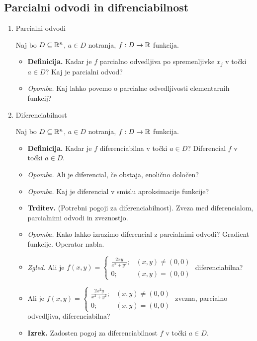 \subsection{Parcialni odvodi in difrenciabilnost}
\begin{enumerate}
    \item Parcialni odvodi
    
    Naj bo $D \subseteq \mathbb{R}^n$, $a \in D$ notranja, $f: D \to \mathbb{R}$ funkcija.
    
    \begin{itemize}
        \item \colorbox{purple!30}{\textbf{Definicija.}} Kadar je $f$ parcialno odvedljiva po spremenljivke $x_j$ v točki $a \in D$? Kaj je parcialni odvod?
        \item \colorbox{yellow!30}{\emph{Opomba.}} Kaj lahko povemo o parcialne odvedljivosti elementarnih funkcij?
    \end{itemize}

    \item Diferenciabilnost
    
    Naj bo $D \subseteq \mathbb{R}^n$, $a \in D$ notranja, $f: D \to \mathbb{R}$ funkcija.
    
    \begin{itemize}
        \item \colorbox{purple!30}{\textbf{Definicija.}} Kadar je $f$ diferenciabilna v točki $a \in D$? Diferencial $f$ v točki $a \in D$.
        \item \colorbox{yellow!30}{\emph{Opomba.}} Ali je diferencial, če obstaja, enolično določen?
        \item \colorbox{yellow!30}{\emph{Opomba.}} Kaj je diferencial v smislu aproksimacije funkcije?
        \item \colorbox{blue!30}{\textbf{Trditev.}} (Potrebni pogoji za diferenciabilnost). Zveza med diferencialom, parcialnimi odvodi in zveznostjo.
        \item \colorbox{yellow!30}{\emph{Opomba.}} Kako lahko izrazimo diferencial z parcialnimi odvodi? Gradient funkcije. Operator nabla.
        \item \colorbox{yellow!30}{\emph{Zgled.}} Ali je $f(x, y) = \begin{cases}
            \frac{2xy}{x^2+y^2}; &(x, y) \neq (0,0) \\ 0; &(x, y) = (0,0)
        \end{cases}$ diferenciabilna?
        \item Ali je $f(x, y) = \begin{cases}
            \frac{2x^2y}{x^2+y^2}; &(x, y) \neq (0,0) \\ 0; &(x, y) = (0,0)
        \end{cases}$ zvezna, parcialno odvedljiva, diferenciabilna?
        \item \colorbox{blue!30}{\textbf{Izrek.}} Zadosten pogoj za diferenciabilnost $f$ v točki $a \in D$.
    \end{itemize}


\end{enumerate}
